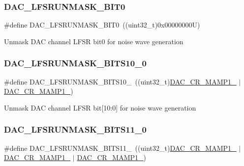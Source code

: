 \subsubsection{\texorpdfstring{DAC\_LFSRUNMASK\_BIT0}{DAC\_LFSRUNMASK\_BIT0}}
{\footnotesize\ttfamily \#define D\+A\+C\+\_\+\+L\+F\+S\+R\+U\+N\+M\+A\+S\+K\+\_\+\+B\+I\+T0~((uint32\+\_\+t)0x00000000\+U)}

Unmask D\+AC channel L\+F\+SR bit0 for noise wave generation \mbox{\label{group___d_a_c_ex__lfsrunmask__triangleamplitude_gac795f6628d7f47337f7c8361b4c39309}} 
\subsubsection{\texorpdfstring{DAC\_LFSRUNMASK\_BITS10\_0}{DAC\_LFSRUNMASK\_BITS10\_0}}
{\footnotesize\ttfamily \#define D\+A\+C\+\_\+\+L\+F\+S\+R\+U\+N\+M\+A\+S\+K\+\_\+\+B\+I\+T\+S10\+\_~((uint32\+\_\+t)\mbox{\hyperlink{group___peripheral___registers___bits___definition_gafdc83b4feb742c632ba66f55d102432b}{D\+A\+C\+\_\+\+C\+R\+\_\+\+M\+A\+M\+P1\+\_}} $\vert$ \mbox{\hyperlink{group___peripheral___registers___bits___definition_ga6cc15817842cb7992d449c448684f68d}{D\+A\+C\+\_\+\+C\+R\+\_\+\+M\+A\+M\+P1\+\_}})}

Unmask D\+AC channel L\+F\+SR bit\mbox{[}10\+:0\mbox{]} for noise wave generation \mbox{\label{group___d_a_c_ex__lfsrunmask__triangleamplitude_ga91b57e42ac27ef9cae7c728d4124e75b}} 
\subsubsection{\texorpdfstring{DAC\_LFSRUNMASK\_BITS11\_0}{DAC\_LFSRUNMASK\_BITS11\_0}}
{\footnotesize\ttfamily \#define D\+A\+C\+\_\+\+L\+F\+S\+R\+U\+N\+M\+A\+S\+K\+\_\+\+B\+I\+T\+S11\+\_~((uint32\+\_\+t)\mbox{\hyperlink{group___peripheral___registers___bits___definition_gafdc83b4feb742c632ba66f55d102432b}{D\+A\+C\+\_\+\+C\+R\+\_\+\+M\+A\+M\+P1\+\_}} $\vert$ \mbox{\hyperlink{group___peripheral___registers___bits___definition_ga6cc15817842cb7992d449c448684f68d}{D\+A\+C\+\_\+\+C\+R\+\_\+\+M\+A\+M\+P1\+\_}} $\vert$ \mbox{\hyperlink{group___peripheral___registers___bits___definition_ga4225dcce22b440fcd3a8ad96c5f2baec}{D\+A\+C\+\_\+\+C\+R\+\_\+\+M\+A\+M\+P1\+\_}})}

